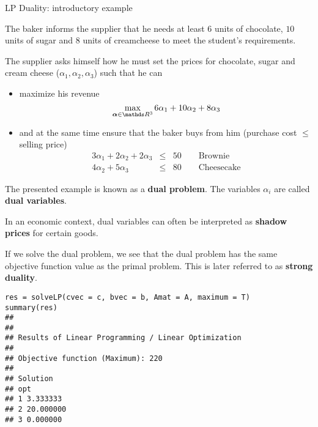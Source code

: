 \documentclass[11pt,compress,t,notes=noshow, xcolor=table]{beamer}
\begin{document}
\begin{vbframe}{LP Duality: introductory example}


\framebreak
\normalsize
The baker informs the supplier that he needs at least $6$ units of chocolate, $10$ units of sugar and $8$ units of creamcheese to meet the student's requirements.

\lz

The supplier asks himself how he must set the prices for chocolate, sugar and cream cheese ($\alpha_1, \alpha_2, \alpha_3$) such that he can

\begin{itemize}
\item maximize his revenue
$$
\max_{\bm{\alpha} \in \R^3}6 \alpha_1 + 10 \alpha_2 + 8 \alpha_3
$$
\item and at the same time ensure that the baker buys from him (purchase cost $\le$ selling price)
\begin{eqnarray*}
3\alpha_1 + 2\alpha_2 + 2\alpha_3 &\le& 50 \qquad \text{Brownie} \\
4\alpha_2 + 5\alpha_3 &\le& 80 \qquad \text{Cheesecake}
\end{eqnarray*}

\end{itemize}

\framebreak

The presented example is known as a \textbf{dual problem}. The variables $\alpha_i$ are called \textbf{dual variables}.

\lz

In an economic context, dual variables can often be interpreted as \textbf{shadow prices} for certain goods.

\lz

If we solve the dual problem, we see that the dual problem has the same objective function value as the primal problem. This is later referred to as \textbf{strong duality}.

%
\framebreak
\footnotesize
\begin{verbatim}
res = solveLP(cvec = c, bvec = b, Amat = A, maximum = T)
summary(res)
##
##
## Results of Linear Programming / Linear Optimization
##
## Objective function (Maximum): 220
##
## Solution
## opt
## 1 3.333333
## 2 20.000000
## 3 0.000000
\end{verbatim}


\end{vbframe}
\end{document}
